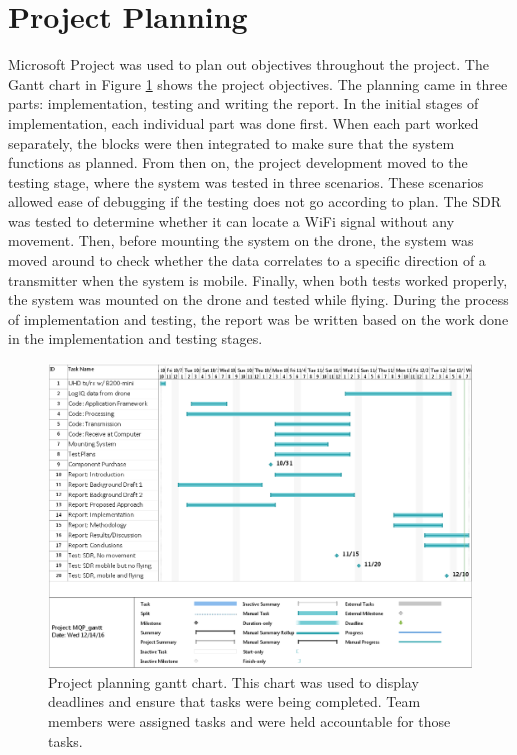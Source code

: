 \section{Project Planning}
Microsoft Project was used to plan out objectives throughout the project. The Gantt chart in Figure \ref{fig:gantt_chart} shows the project objectives. The planning came in three parts: implementation, testing and writing the report. In the initial stages of implementation, each individual part was done first. When each part worked separately, the blocks were then integrated to make sure that the system functions as planned. From then on, the project development moved to the testing stage, where the system was tested in three scenarios. These scenarios allowed ease of debugging if the testing does not go according to plan. The SDR was tested to determine whether it can locate a WiFi signal without any movement. Then, before mounting the system on the drone, the system was moved around to check whether the data correlates to a specific direction of a transmitter when the system is mobile. Finally, when both tests worked properly, the system was mounted on the drone and tested while flying. During the process of implementation and testing, the report was be written based on the work done in the implementation and testing stages.
\begin{figure}[ht]
\centering
\includegraphics[width=\textwidth]{img/oct_gantt_chart.png}
\caption{Project planning gantt chart. This chart was used to display deadlines and ensure that tasks were being completed. Team members were assigned tasks and were held accountable for those tasks.}
\label{fig:gantt_chart}
\end{figure}
